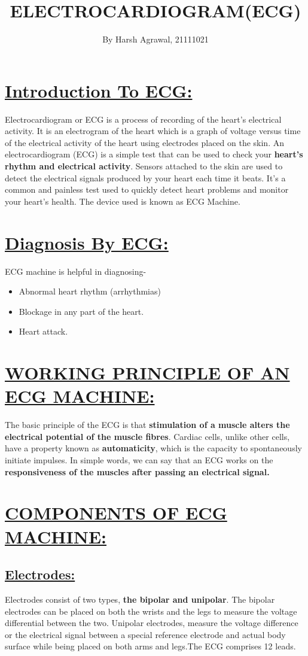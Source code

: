 \documentclass[12pt]{article}
\title{\textbf{ELECTROCARDIOGRAM(ECG)}}
\author{By Harsh Agrawal, 21111021}
\date{}
\begin{document}
\maketitle
{}

\raggedright{\section{\underline{Introduction To ECG:}}}
Electrocardiogram or ECG is a  process of recording of the heart's electrical activity. It is an electrogram of the heart which is a graph of voltage versus time of the electrical activity of the heart using electrodes placed on the skin.
An electrocardiogram (ECG) is a simple test that can be used to check your \textbf{heart's rhythm and electrical activity}.
Sensors attached to the skin are used to detect the electrical signals produced by your heart each time it beats.
It's a common and painless test used to quickly detect heart problems and monitor your heart's health.
The device used is known as ECG Machine.
\section{\underline{Diagnosis By ECG:}}
ECG machine is helpful in diagnosing-
\begin{itemize}
\item Abnormal heart rhythm (arrhythmias)
\item Blockage in any part of the heart.
\item Heart attack.
\end{itemize}
\section{\underline{WORKING PRINCIPLE OF AN ECG MACHINE:}}
The basic principle of the ECG is that \textbf{stimulation of a muscle alters the electrical potential of the muscle fibres}. 
Cardiac cells, unlike other cells, have a property known as \textbf{automaticity}, which is the capacity to spontaneously initiate impulses.
In simple words, we can say that an ECG works on the 
\textbf{responsiveness of the muscles after passing an electrical signal.}
\section{\underline{COMPONENTS OF ECG MACHINE:}}
\subsection{\underline{Electrodes:}}
Electrodes consist of two types, \textbf{the bipolar and unipolar}. The bipolar electrodes can be placed on both the wrists and the legs to measure the voltage differential between the two.
Unipolar electrodes, measure the voltage difference or the electrical signal between a special reference electrode and actual body surface while being placed on both arms and legs.The ECG comprises 12 leads.
\end{document}
